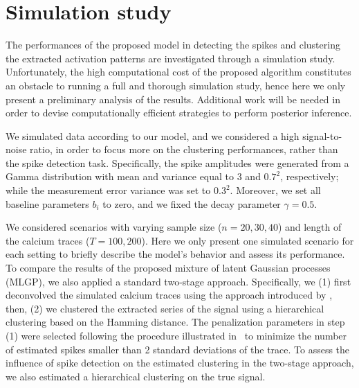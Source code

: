 \section{Simulation study}\label{ch4:sec_sim}
The performances of the proposed model in detecting the spikes and clustering the extracted activation patterns are investigated through a simulation study. Unfortunately, the high computational cost of the proposed algorithm constitutes an obstacle to running a full and thorough simulation study, hence here we only present a preliminary analysis of the results. Additional work will be needed in order to devise computationally efficient strategies to perform posterior inference.

We simulated data according to our model, and we considered a high signal-to-noise ratio, in order to focus more on the clustering performances, rather than the spike detection task. Specifically, the spike amplitudes were generated from a Gamma distribution with mean and variance equal to 3 and $0.7^2$, respectively; while the measurement error variance was set to $0.3^2$. Moreover, we set all baseline parameters $b_i$ to zero, and we fixed the decay parameter $\gamma=0.5$.

We considered scenarios with varying sample size ($n = 20, 30, 40$) and length of the calcium traces ($T = 100, 200$). Here we only present one simulated scenario for each setting to briefly describe the model's behavior and assess its performance. To compare the results of the proposed mixture of latent Gaussian processes (MLGP), we also applied a standard two-stage approach. Specifically, we (1) first deconvolved the simulated calcium traces using the approach introduced by \textcite{jewell2019}, then, (2) we clustered the extracted series of the signal using a hierarchical clustering based on the Hamming distance. The penalization parameters in step (1) were selected following the procedure illustrated in~\textcite{vries2020} to minimize the number of estimated spikes smaller than 2 standard deviations of the trace. To assess the influence of spike detection on the estimated clustering in the two-stage approach, we also estimated a hierarchical clustering on the true signal. 



